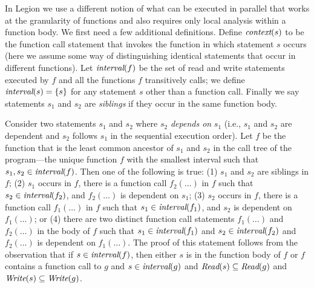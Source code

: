 In Legion we use a different notion of what can be executed
in parallel that works at the granularity of functions and also
requires only local analysis within a function body.  We first need a few
additional definitions.  Define $\mbox{\em context}(s)$ to be the function call
statement that invokes the function in which statement $s$ occurs
(here we assume some way of distinguishing identical statements that
occur in different functions).  Let $\mbox{\em interval}(f)$ be the set of
read and write statements executed by $f$ and all the
functions $f$ transitively calls; we define $\mbox{\em interval}(s) = \{ s \}$
for any statement $s$ other than a function call.  Finally we say
statements $s_1$ and $s_2$ are {\em siblings} if they occur in the
same function body.

Consider two statements $s_1$ and $s_2$ where $s_2$ {\em depends on}
$s_1$ (i.e., $s_1$ and $s_2$ are dependent and $s_2$ follows $s_1$ in
the sequential execution order).  Let $f$ be the function that is the
least common ancestor of $s_1$ and $s_2$ in the call tree of the
program---the unique function $f$ with the smallest interval such that
$s_1,s_2 \in \mbox{\em interval}(f)$.  Then one of the following is true: (1) $s_1$ and $s_2$ are siblings in $f$;
(2) $s_1$ occurs in $f$, there is a function call $f_2(\ldots)$ in $f$ such that $s_2 \in \mbox{\em interval}(f_2)$, and $f_2(\ldots)$
is dependent on $s_1$;
(3) $s_2$ occurs in $f$, there is a function call $f_1(\ldots)$ in $f$ such that $s_1 \in \mbox{\em interval}(f_1)$, and
$s_2$ is dependent on $f_1(\ldots)$; or
(4) there are two distinct function call statements $f_1(\ldots)$ and $f_2(\ldots)$ in the body of $f$ such
that $s_1 \in \mbox{\em interval}(f_1)$ and $s_2 \in \mbox{\em interval}(f_2)$ and $f_2(\ldots)$ is dependent on $f_1(\ldots)$.
The proof of this statement follows from the observation that if $s \in \mbox{\em interval}(f)$, then either $s$ is in the function body of $f$ or $f$ contains a function call to $g$ and $s \in \mbox{\em interval}(g)$ and $\mbox{\em Read}(s) \subseteq \mbox{\em Read}(g)$
and $\mbox{\em Write}(s) \subseteq \mbox{\em Write}(g)$.

